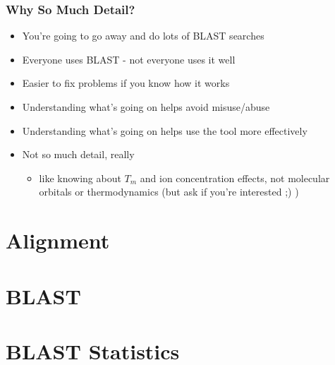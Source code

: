 \begin{frame}
  \frametitle{Why So Much Detail?}
  \begin{itemize}
    \item You're going to go away and do lots of BLAST searches
    \item Everyone uses BLAST - not everyone uses it well
    \item Easier to fix problems if you know how it works
    \item Understanding what's going on helps avoid misuse/abuse
    \item Understanding what's going on helps use the tool more effectively
    \item Not so much detail, really
    \begin{itemize}
      \item like knowing about $T_m$ and ion concentration effects, not molecular 
               orbitals or thermodynamics (but ask if you're interested ;) )
    \end{itemize}
  \end{itemize}
\end{frame}      

  
\section{Alignment} 
  
  
  

\section{BLAST}
  

\section{BLAST Statistics}
   
  
  
